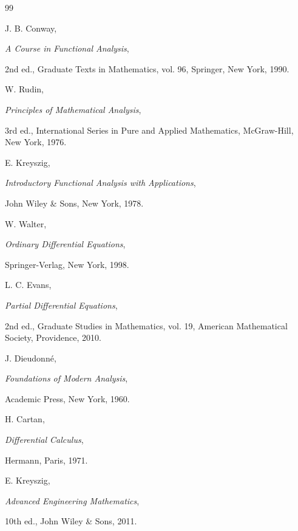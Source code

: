 \documentclass[12pt]{article}
\numberwithin{equation}{section}
\theoremstyle{definition}
\theoremstyle{remark}
\begin{document}
\begin{thebibliography}{99}

J. B. Conway,

\emph{A Course in Functional Analysis},

2nd ed., Graduate Texts in Mathematics,
vol. 96, Springer, New York, 1990.

W. Rudin,

\emph{Principles of Mathematical Analysis},

3rd ed., International Series in Pure
and Applied Mathematics,
McGraw-Hill, New York, 1976.

E. Kreyszig,

\emph{Introductory Functional Analysis
with Applications},

John Wiley \& Sons, New York, 1978.

W. Walter,

\emph{Ordinary Differential Equations},

Springer-Verlag, New York, 1998.

L. C. Evans,

\emph{Partial Differential Equations},

2nd ed., Graduate Studies in Mathematics,
vol. 19, American Mathematical Society,
Providence, 2010.

J. Dieudonn\'e,

\emph{Foundations of Modern Analysis},

Academic Press, New York, 1960.

H. Cartan,

\emph{Differential Calculus},

Hermann, Paris, 1971.

E. Kreyszig,

\emph{Advanced Engineering Mathematics},

10th ed., John Wiley \& Sons, 2011.

\end{thebibliography}
\end{document}
